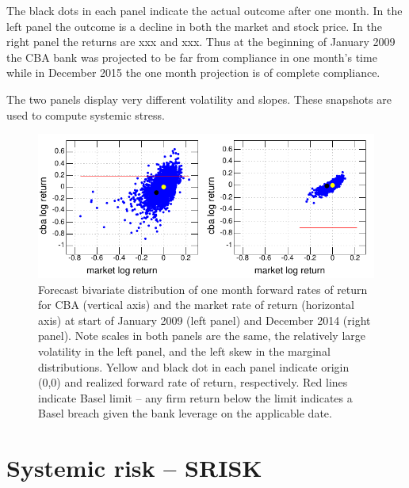 \documentclass[authoryear]{elsarticle}
\begin{document}
 The black dots in each panel indicate the actual outcome after one month.    In the left panel the outcome is a decline in both  the market and stock price.    In the right panel the returns are xxx and xxx.    Thus at the beginning of January  2009 the CBA bank was projected to be far from compliance in one month's time  while in December 2015 the one month projection is of complete compliance.  
 
 The two panels  display very different volatility and slopes.  These snapshots are used to compute systemic stress.  

\begin{figure}[htbp]
\begin{center}
\includegraphics{figures/simulation.pdf}
\caption{Forecast bivariate distribution of one month forward rates of return   for CBA (vertical axis) and the market rate of return (horizontal axis) at start of January 2009 (left panel)  and December 2014 (right panel). Note scales in both panels are the same, the relatively large volatility in the left panel, and the left skew in the  marginal distributions.  Yellow and black dot in each panel indicate origin (0,0) and  realized forward  rate of return, respectively.   Red lines indicate Basel limit -- any firm return below the limit indicates a Basel breach given the bank leverage on the applicable date.}
\label{simulation}
\end{center}
\end{figure}




\section{Systemic risk -- SRISK}\label{srisk}
\end{document}
